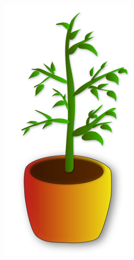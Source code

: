     \begin{figure}
      \caption{\textbf{Icon Types}
        (a) Plants represent progress.
        (b) Birds represent wellness or general status.
        (c) Hamsters represent activity or arousal.
      }
      \centering
      \begin{subfigure}[b]{0.3\textwidth}
        \includegraphics[width=\textwidth]{ic_plant2.png}

\end{subfigure}
\end{figure}
